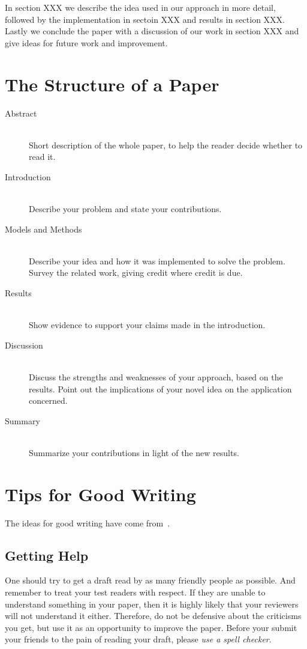 \documentclass[10pt,conference,compsocconf]{IEEEtran}
\begin{document}
In section XXX we describe the idea used in our approach in more detail,
followed by the implementation in sectoin XXX and results in section XXX.
Lastly we conclude the paper with a discussion of our work in section XXX and 
give ideas for future work and improvement.

\section{The Structure of a Paper}
\label{sec:structure-paper}

\begin{description}
\item[Abstract] \ \\
  Short description of the whole paper, to help the
  reader decide whether to read it.
\item[Introduction] \ \\
  Describe your problem and state your
  contributions.
\item[Models and Methods] \ \\
  Describe your idea and how it was implemented to solve
  the problem. Survey the related work, giving credit where credit is
  due.
\item[Results] \ \\
  Show evidence to support your claims made in the
  introduction.
\item[Discussion] \ \\
  Discuss the strengths and weaknesses of your
  approach, based on the results. Point out the implications of your
  novel idea on the application concerned.
\item[Summary] \ \\
  Summarize your contributions in light of the new
  results.
\end{description}


\section{Tips for Good Writing}
\label{sec:tips-writing}

The ideas for good writing have come
from~\cite{editor10,jones08,anderson04}.

\subsection{Getting Help}
One should try to get a draft read by as many friendly people as
possible. And remember to treat your test readers with respect. If
they are unable to understand something in your paper, then it is
highly likely that your reviewers will not understand it
either. Therefore, do not be defensive about the criticisms you get,
but use it as an opportunity to improve the paper. Before your submit
your friends to the pain of reading your draft, please \emph{use a
  spell checker}.
\end{document}
